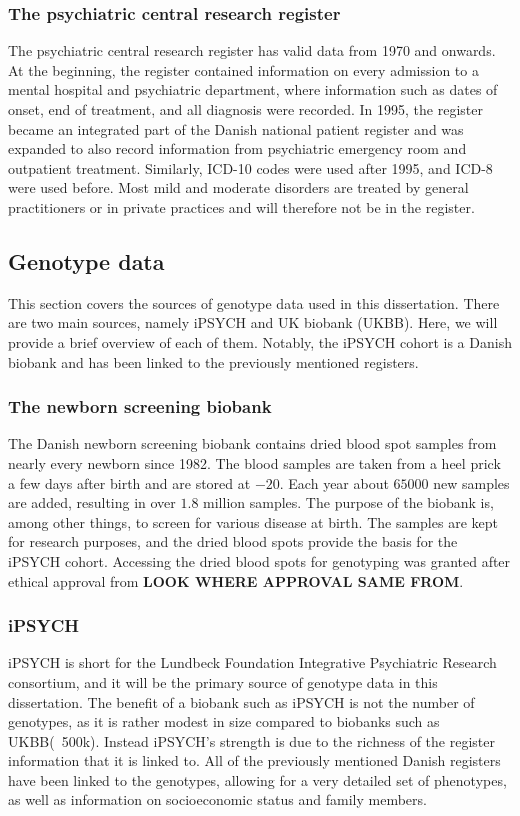 \subsubsection{The psychiatric central research register}
The psychiatric central research register has valid data from 1970 and onwards. At the beginning, the register contained information on every admission to a mental hospital and psychiatric department, where information such as dates of onset, end of treatment, and all diagnosis were recorded. In 1995, the register became an integrated part of the Danish national patient register and was expanded to also record information from psychiatric emergency room and outpatient treatment. Similarly, ICD-10 codes were used after 1995, and ICD-8 were used before. Most mild and moderate disorders are treated by general practitioners or in private practices and will therefore not be in the register.\cite{mors2011danish}



\subsection{Genotype data}
This section covers the sources of genotype data used in this dissertation. There are two main sources, namely iPSYCH and UK biobank (UKBB). Here, we will provide a brief overview of each of them. Notably, the iPSYCH cohort is a Danish biobank and has been linked to the previously mentioned registers. 

\subsubsection{The newborn screening biobank}
The Danish newborn screening biobank contains dried blood spot samples from nearly every newborn since 1982. The blood samples are taken from a heel prick a few days after birth and are stored at $ -20 $\textcelsius. Each year about $ 65000 $ new samples are added, resulting in over $ 1.8 $ million samples. The purpose of the biobank is, among other things, to screen for various disease at birth. The samples are kept for research purposes, and the dried blood spots provide the basis for the iPSYCH cohort. Accessing the dried blood spots for genotyping was granted after ethical approval from \textbf{LOOK WHERE APPROVAL SAME FROM}. \cite{norgaard2007storage}

\subsubsection{iPSYCH}
iPSYCH is short for the Lundbeck Foundation Integrative Psychiatric Research consortium, and it will be the primary source of genotype data in this dissertation. The benefit of a biobank such as iPSYCH is not the number of genotypes, as it is rather modest in size compared to biobanks such as UKBB(~500k). Instead iPSYCH's strength is due to the richness of the register information that it is linked to. All of the previously mentioned Danish registers have been linked to the genotypes, allowing for a very detailed set of phenotypes, as well as information on socioeconomic status and family members.

